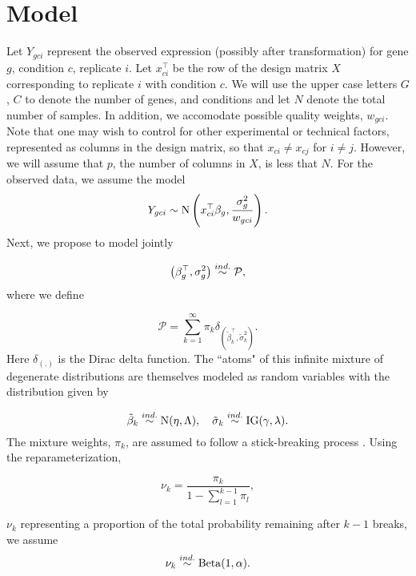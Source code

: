 \section{Model}
Let $Y_{gci}$ represent the observed expression (possibly after transformation) for gene $g$, condition $c$, replicate $i$. Let $x_{ci}^\top$ be the row of the design matrix $X$ corresponding to replicate $i$ with condition $c$. We will use the upper case letters $G$, $C$ to denote the number of genes, and conditions and let $N$ denote the total number of samples. In addition, we accomodate possible quality weights, $w_{gci}$.  Note that one may wish to control for other experimental or technical factors, represented as columns in the design matrix, so that $x_{ci} \neq x_{cj}$ for $i \neq j$. However, we will assume that $p$,  the number of columns in $X$, is less that $N$. For the observed data, we assume the model
\begin{equation}
Y_{gci} \sim \operatorname{N} \left( x_{ci}^\top \beta_g, \frac{\sigma^2_g}{w_{gci}} \right).
\end{equation}
Next, we propose to model jointly

\begin{equation}
\left(\beta_g^\top,\sigma^2_g\right) \stackrel{ind.}{\sim} \mathcal{P},
\end{equation}
where we define

\begin{equation}
\mathcal{P} =\sum_{k=1}^\infty \pi_k \delta_{\left(\tilde{\beta}_k^\top ,\tilde{\sigma}^2_k\right)}.
\end{equation}
Here $\delta_{(.)}$ is the Dirac delta function. The ``atoms" of this infinite mixture of degenerate distributions are themselves modeled as random variables with the distribution given by

\begin{equation}
\tilde{\beta}_k \stackrel{ind.}{\sim} \operatorname{N}(\eta, \Lambda),\quad \tilde{\sigma}_k \stackrel{ind.}{\sim} \operatorname{IG}(\gamma, \lambda).
\end{equation}
The mixture weights, $\pi_k$,  are assumed to follow a stick-breaking process \citep{sethuraman}. Using the reparameterization,

\begin{equation}
\nu_k = \frac{\pi_k}{1 - \sum_{l=1}^{k-1} \pi_l},
\end{equation}

$\nu_k$ representing a proportion of the total probability remaining after $k-1$ breaks, we assume
\begin{equation}
\nu_k \stackrel{ind.}{\sim} \operatorname{Beta}(1, \alpha).
\end{equation}

